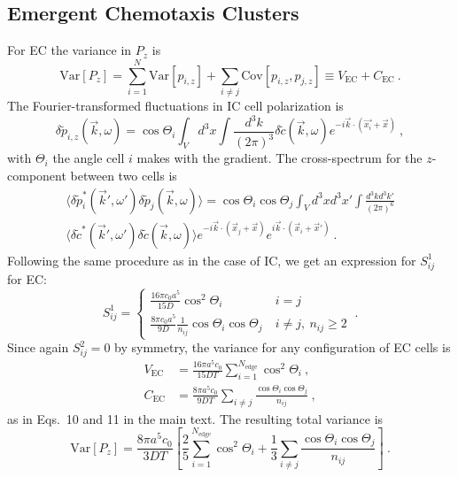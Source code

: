 \subsection{Emergent Chemotaxis Clusters}
For EC the variance in $P_z$ is
\begin{equation}
    \text{Var}[P_z] = \sum_{i=1}^N \text{Var}[p_{i,z}] + \sum_{i\neq j} \text{Cov}[p_{i,z},p_{j,z}] \equiv V_\text{EC} + C_\text{EC} \ .
\end{equation}
The Fourier-transformed fluctuations in IC cell polarization is
\begin{equation}
    \delta\tilde{p}_{i,z}(\vec{k},\omega) = \cos\Theta_i \int_V d^3x \int \frac{d^3k}{(2\pi)^3}
    \delta\tilde{c}(\vec{k},\omega)
    e^{-i\vec{k}\cdot(\vec{x_i}+\vec{x})} \ ,
\end{equation}
with $\Theta_i$ the angle cell $i$ makes with the gradient.
The cross-spectrum for the $z$-component between two cells is
\begin{equation} \label{eq:pijEC1}
\begin{split}
    \langle\delta\tilde{p}_i^*(\vec{k}',\omega')\delta\tilde{p}_j(\vec{k},\omega) \rangle = \cos\Theta_i \cos\Theta_j \int_V d^3x d^3x' \int \frac{d^3kd^3k'}{(2\pi)^6} \\
    \langle \delta\tilde{c}^*(\vec{k}',\omega')\delta\tilde{c}(\vec{k},\omega) \rangle
    e^{-i\vec{k}\cdot(\vec{x}_j+\vec{x})} e^{i\vec{k}\cdot(\vec{x}_i+\vec{x}')} \ .
\end{split}
\end{equation}
Following the same procedure as in the case of IC, we get an expression for $S_{ij}^1$ for EC:
\begin{equation} \label{eq:SijEC1}
    S_{ij}^1 =
    \begin{cases}
        \frac{16\pi c_0a^5}{15D} \cos^2\Theta_i &\ i=j \\
        \frac{8\pi c_0a^5}{9D} \frac{1}{n_{ij}} \cos\Theta_i \cos\Theta_j &\ i \neq j, \ n_{ij} \geq 2
    \end{cases} \ .
\end{equation}
Since again $S^2_{ij}=0$ by symmetry, the variance for any configuration of EC cells is
\begin{align}
    V_\text{EC} &= \frac{16\pi a^5c_0}{15DT} \sum_{i=1}^{N_\text{edge}} \cos^2\Theta_i \ , \label{eq:ECV1} \\
    C_\text{EC} &= \frac{8\pi a^5c_0}{9DT} \sum_{i\neq j} \frac{\cos\Theta_i \cos\Theta_j}{n_{ij}} \ , \label{eq:ECC1}
\end{align}
as in Eqs.\ 10 and 11 in the main text. The resulting total variance is
\begin{equation} \label{eq:ECvarP}
    \text{Var}[P_z] = \frac{8\pi a^5c_0}{3DT} \left[ \frac{2}{5} \sum_{i=1}^{N_\text{edge}} \cos^2\Theta_i +  \frac{1}{3} \sum_{i\neq j} \frac{\cos\Theta_i \cos\Theta_j}{n_{ij}} \right] \ .
\end{equation}


